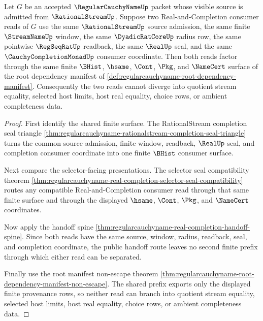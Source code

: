 \begin{theorem}
\label{thm:regularcauchyname-real-completion-prefix-determinacy}
Let $G$ be an accepted $\RegularCauchyNameUp$ packet whose visible source is admitted from $\RationalStreamUp$. Suppose two Real-and-Completion consumer reads of $G$ use the same $\RationalStreamUp$ source admission, the same finite $\StreamNameUp$ window, the same $\DyadicRatCoreUp$ radius row, the same pointwise $\RegSeqRatUp$ readback, the same $\RealUp$ seal, and the same $\CauchyCompletionMonadUp$ consumer coordinate. Then both reads factor through the same finite $\BHist$, $\hsame$, $\Cont$, $\Pkg$, and $\NameCert$ surface of the root dependency manifest of \autoref{def:regularcauchyname-root-dependency-manifest}. Consequently the two reads cannot diverge into quotient stream equality, selected host limits, host real equality, choice rows, or ambient completeness data.
\end{theorem}
\begin{proof}
First identify the shared finite surface. The RationalStream completion seal triangle \autoref{thm:regularcauchyname-rationalstream-completion-seal-triangle} turns the common source admission, finite window, readback, $\RealUp$ seal, and completion consumer coordinate into one finite $\BHist$ consumer surface.

Next compare the selector-facing presentations. The selector seal compatibility theorem \autoref{thm:regularcauchyname-real-completion-selector-seal-compatibility} routes any compatible Real-and-Completion consumer read through that same finite surface and through the displayed $\hsame$, $\Cont$, $\Pkg$, and $\NameCert$ coordinates.

Now apply the handoff spine \autoref{thm:regularcauchyname-real-completion-handoff-spine}. Since both reads have the same source, window, radius, readback, seal, and completion coordinate, the public handoff route leaves no second finite prefix through which either read can be separated.

Finally use the root manifest non-escape theorem \autoref{thm:regularcauchyname-root-dependency-manifest-non-escape}. The shared prefix exports only the displayed finite provenance rows, so neither read can branch into quotient stream equality, selected host limits, host real equality, choice rows, or ambient completeness data.
\end{proof}

